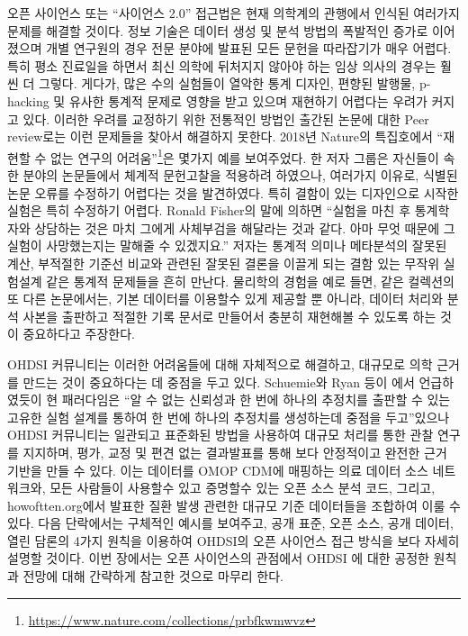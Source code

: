 \documentclass[11pt]{book}
\let\rmarkdownfootnote\footnote%
\def\footnote{\protect\rmarkdownfootnote}
\theoremstyle{definition}
\theoremstyle{definition}
\theoremstyle{definition}
\theoremstyle{remark}
\begin{document}
오픈 사이언스 또는 ``사이언스 2.0'' \citep{wiki:Science_2.0} 접근법은
현재 의학계의 관행에서 인식된 여러가지 문제를 해결할 것이다. 정보 기술은
데이터 생성 및 분석 방법의 폭발적인 증가로 이어졌으며 개별 연구원의 경우
전문 분야에 발표된 모든 문헌을 따라잡기가 매우 어렵다. 특히 평소
진료일을 하면서 최신 의학에 뒤처지지 않아야 하는 임상 의사의 경우는 훨씬
더 그렇다. 게다가, 많은 수의 실험들이 열악한 통계 디자인, 편향된 발행물,
p-hacking 및 유사한 통계적 문제로 영향을 받고 있으며 재현하기 어렵다는
우려가 커지고 있다. 이러한 우려를 교정하기 위한 전통적인 방법인 출간된
논문에 대한 Peer review로는 이런 문제들을 찾아서 해결하지 못한다. 2018년
Nature의 특집호에서 ``재현할 수 없는 연구의 어려움''\footnote{\url{https://www.nature.com/collections/prbfkwmwvz}}은
몇가지 예를 보여주었다. 한 저자 그룹은 자신들이 속한 분야의 논문들에서
체계적 문헌고찰을 적용하려 하였으나, 여러가지 이유로, 식별된 논문 오류를
수정하기 어렵다는 것을 발견하였다. 특히 결함이 있는 디자인으로 시작한
실험은 특히 수정하기 어렵다. Ronald Fisher의 말에 의하면 ``실험을 마친
후 통계학자와 상담하는 것은 마치 그에게 사체부검을 해달라는 것과 같다.
아마 무엇 때문에 그 실험이 사망했는지는 말해줄 수 있겠지요.''
\citep{wikiquote:Ronald_Fisher} 저자는 통계적 의미나 메타분석의 잘못된
계산, 부적절한 기준선 비교와 관련된 잘못된 결론을 이끌게 되는 결함 있는
무작위 실험설계 같은 통계적 문제들을 흔히 만난다. \citep{allison_2016}
물리학의 경험을 예로 들면, 같은 컬렉션의 또 다른 논문에서는, 기본
데이터를 이용할수 있게 제공할 뿐 아니라, 데이터 처리와 분석 사본을
출판하고 적절한 기록 문서로 만들어서 충분히 재현해볼 수 있도록 하는 것이
중요하다고 주장한다. \citep{Chen2018}

OHDSI 커뮤니티는 이러한 어려움들에 대해 자체적으로 해결하고, 대규모로
의학 근거를 만드는 것이 중요하다는 데 중점을 두고 있다. Schuemie와 Ryan
등이 \citet{schuemie_2018b} 에서 언급하였듯이 현 패러다임은 ``알 수 없는
신뢰성과 한 번에 하나의 추정치를 출판할 수 있는 고유한 실험 설계를
통하여 한 번에 하나의 추정치를 생성하는데 중점을 두고''있으나 OHDSI
커뮤니티는 일관되고 표준화된 방법을 사용하여 대규모 처리를 통한 관찰
연구를 지지하며, 평가, 교정 및 편견 없는 결과발표를 통해 보다 안정적이고
완전한 근거 기반을 만들 수 있다. 이는 데이터를 OMOP CDM에 매핑하는 의료
데이터 소스 네트워크와, 모든 사람들이 사용할수 있고 증명할수 있는 오픈
소스 분석 코드, 그리고, howoftten.org에서 발표한 질환 발생 관련한 대규모
기준 데이터들을 조합하여 이룰 수 있다. 다음 단락에서는 구체적인 예시를
보여주고, 공개 표준, 오픈 소스, 공개 데이터, 열린 담론의 4가지 원칙을
이용하여 OHDSI의 오픈 사이언스 접근 방식을 보다 자세히 설명할 것이다.
이번 장에서는 오픈 사이언스의 관점에서 OHDSI 에 대한 공정한 원칙과
전망에 대해 간략하게 참고한 것으로 마무리 한다.
\end{document}
